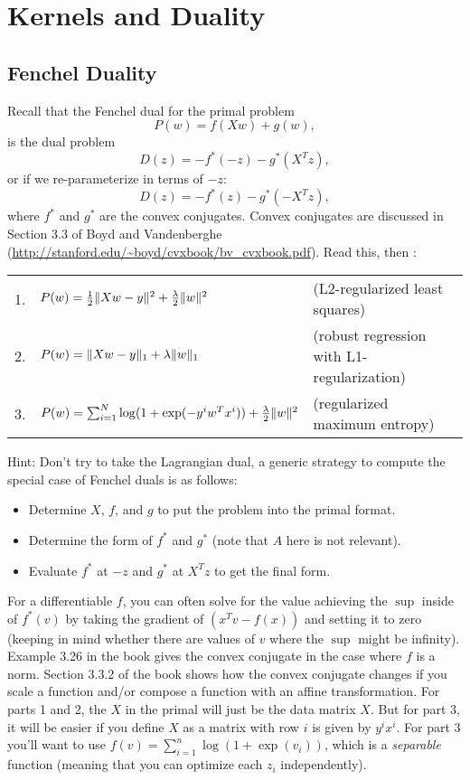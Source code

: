 \documentclass{article}
\begin{document}
\section{Kernels and Duality}

\subsection{Fenchel Duality}


Recall that the Fenchel dual for the primal problem
\[
P(w) = f(Xw) + g(w),
\]
is the dual problem
\[
D(z) = - f^*(-z) - g^*(X^Tz),
\]
or if we re-parameterize in terms of $-z$:
\begin{equation}
\label{eq:FD2}
D(z) = - f^*(z) - g^*(-X^Tz),
\end{equation}
where $f^*$ and $g^*$ are the convex conjugates.
Convex conjugates are discussed in Section 3.3 of Boyd and Vandenberghe (\url{http://stanford.edu/~boyd/cvxbook/bv_cvxbook.pdf}). Read this, then :
\begin{center}
\begin{tabular}{lll}
1. & $P(w) = \frac{1}{2}\|Xw - y\|^2 +  \frac{\lambda}{2}\|w\|^2$ & (L2-regularized least squares)\\
2. & $P(w) = \|Xw -y\|_1 + \lambda\|w\|_1$ & (robust regression with L1-regularization)\\
3. & $P(w) = \sum_{i=1}^N \log(1+\exp(-y^iw^Tx^i)) + \frac{\lambda}{2}\|w\|^2$ & (regularized maximum entropy)
\end{tabular}
\end{center}
Hint: Don't try to take the Lagrangian dual, a generic strategy to compute the special case of Fenchel duals is as follows:
\begin{itemize}
\item Determine $X$, $f$, and $g$ to put the problem into the primal format.
\item Determine the form of $f^*$ and $g^*$ (note that $A$ here is not relevant).
\item Evaluate $f^*$ at $-z$ and $g^*$ at $X^Tz$ to get the final form.
\end{itemize}
For a differentiable $f$, you can often solve for the value achieving the $\sup$ inside of $f^*(v)$ by taking the gradient of $(x^Tv - f(x))$ and setting it to zero (keeping in mind whether there are values of $v$ where the $\sup$ might be infinity). Example 3.26 in the book gives the convex conjugate in the case where $f$ is a norm. Section 3.3.2 of the book shows how the convex conjugate changes if you scale a function and/or compose a function with an affine transformation. For parts 1 and 2, the $X$ in the primal will just be the data matrix $X$. But for part 3, it will be easier if you define $X$ as a matrix with row $i$ is given by $y^ix^i$. For part 3 you'll want to use $f(v) = \sum_{i=1}^n \log(1 + \exp(v_i))$, which is a \emph{separable} function (meaning that you can optimize each $z_i$ independently).
\end{document}
